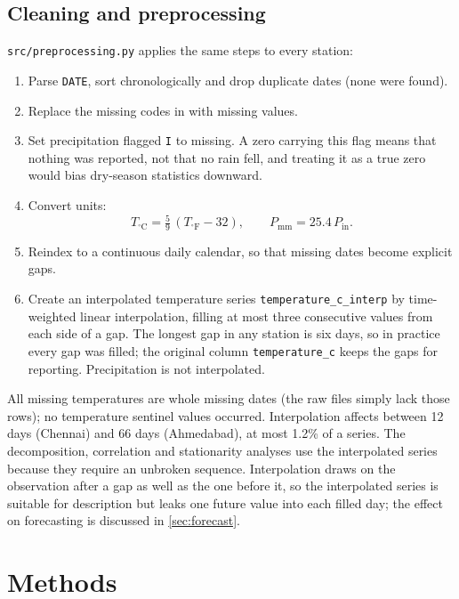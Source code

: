 \documentclass[11pt,a4paper]{article}
\newcommand{\code}[1]{\texttt{#1}}
\begin{document}
\subsection{Cleaning and preprocessing}
\label{sec:cleaning}

\code{src/preprocessing.py} applies the same steps to every station:
\begin{enumerate}
  \item Parse \code{DATE}, sort chronologically and drop duplicate dates (none were found).
  \item Replace the missing codes in  with missing values.
  \item Set precipitation flagged \code{I} to missing. A zero carrying this flag means that nothing was reported, not that no rain fell, and treating it as a true zero would bias dry-season statistics downward.
  \item Convert units:
  \begin{equation}
    T_{^\circ\mathrm{C}} = \tfrac{5}{9}\,(T_{^\circ\mathrm{F}} - 32), \qquad
    P_{\mathrm{mm}} = 25.4\,P_{\mathrm{in}}.
  \end{equation}
  \item Reindex to a continuous daily calendar, so that missing dates become explicit gaps.
  \item Create an interpolated temperature series \code{temperature\_c\_interp} by time-weighted linear interpolation, filling at most three consecutive values from each side of a gap. The longest gap in any station is six days, so in practice every gap was filled; the original column \code{temperature\_c} keeps the gaps for reporting. Precipitation is not interpolated.
\end{enumerate}
All missing temperatures are whole missing dates (the raw files simply lack those rows); no temperature sentinel values occurred. Interpolation affects between 12 days (Chennai) and 66 days (Ahmedabad), at most 1.2\% of a series. The decomposition, correlation and stationarity analyses use the interpolated series because they require an unbroken sequence. Interpolation draws on the observation after a gap as well as the one before it, so the interpolated series is suitable for description but leaks one future value into each filled day; the effect on forecasting is discussed in \cref{sec:forecast}.

\section{Methods}
\label{sec:methods}
\end{document}
